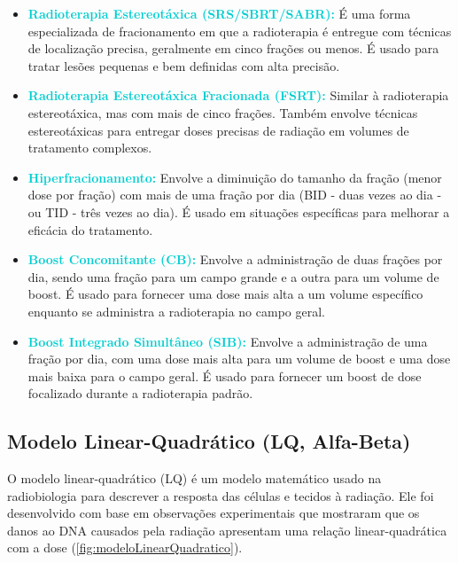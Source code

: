 \documentclass[11pt,a4paper]{article}
\begin{document}
\begin{itemize}
		\item \textcolor{DarkTurquoise}{\textbf{Radioterapia Estereotáxica (SRS/SBRT/SABR):}} É uma forma especializada de fracionamento em que a radioterapia é entregue com técnicas de localização precisa, geralmente em cinco frações ou menos. É usado para tratar lesões pequenas e bem definidas com alta precisão.

		\item \textcolor{DarkTurquoise}{\textbf{Radioterapia Estereotáxica Fracionada (FSRT):}} Similar à radioterapia estereotáxica, mas com mais de cinco frações. Também envolve técnicas estereotáxicas para entregar doses precisas de radiação em volumes de tratamento complexos.

		\item \textcolor{DarkTurquoise}{\textbf{Hiperfracionamento:}} Envolve a diminuição do tamanho da fração (menor dose por fração) com mais de uma fração por dia (BID - duas vezes ao dia - ou TID - três vezes ao dia). É usado em situações específicas para melhorar a eficácia do tratamento.

		\item \textcolor{DarkTurquoise}{\textbf{Boost Concomitante (CB):}} Envolve a administração de duas frações por dia, sendo uma fração para um campo grande e a outra para um volume de boost. É usado para fornecer uma dose mais alta a um volume específico enquanto se administra a radioterapia no campo geral.

		\item \textcolor{DarkTurquoise}{\textbf{Boost Integrado Simultâneo (SIB):}} Envolve a administração de uma fração por dia, com uma dose mais alta para um volume de boost e uma dose mais baixa para o campo geral. É usado para fornecer um boost de dose focalizado durante a radioterapia padrão.
	\end{itemize}

\subsection*{Modelo Linear-Quadrático (LQ, Alfa-Beta)}

	O modelo linear-quadrático (LQ) é um modelo matemático usado na radiobiologia para descrever a resposta das células e tecidos à radiação. Ele foi desenvolvido com base em observações experimentais que mostraram que os danos ao DNA causados pela radiação apresentam uma relação linear-quadrática com a dose (\ref{fig:modeloLinearQuadratico}).
\end{document}
